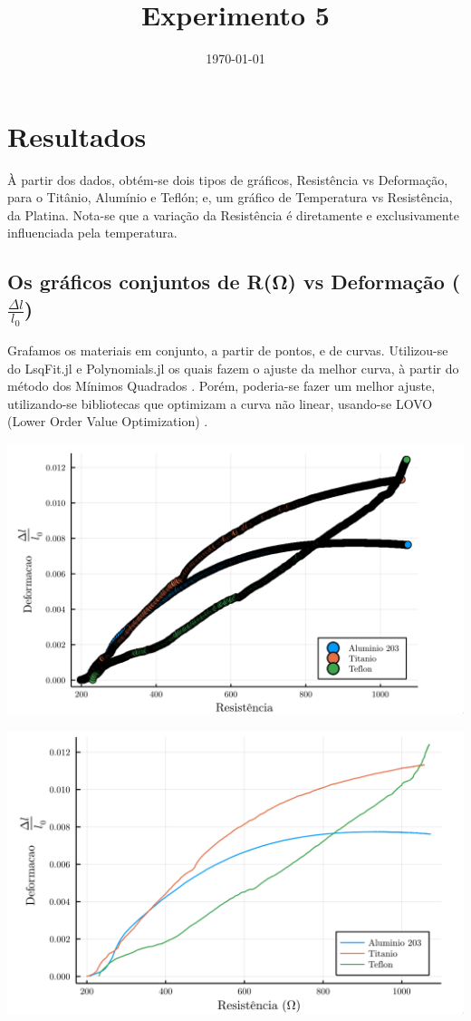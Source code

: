 \documentclass[11pt]{article}
\date{\today}
\title{Experimento 5}
\begin{document}
\maketitle
\tableofcontents




\section{Resultados}
\label{sec:orgb75f9fe}
À partir dos dados, obtém-se dois tipos de gráficos, Resistência vs Deformação,  para o Titânio, Alumínio e Teflón; e, um gráfico de Temperatura vs Resistência, da Platina. Nota-se que a variação da Resistência é diretamente e exclusivamente influenciada pela temperatura.

\subsection{Os gráficos conjuntos de R(Ω) vs Deformação (\(\frac{\Delta l}{l_0}\))}
\label{sec:org9e18702}

Grafamos os materiais em conjunto, a partir de pontos, e de curvas. Utilizou-se do LsqFit.jl e Polynomials.jl os quais fazem o ajuste da melhor curva, à partir do método dos Mínimos Quadrados \cite{boyd2018introduction}. Porém, poderia-se fazer um melhor ajuste\cite{castelani2019raff}, utilizando-se bibliotecas  que optimizam a curva não linear, usando-se LOVO (Lower Order Value Optimization) \cite{castelani2021robust}.

\href{img/comparacao-conjunta.png}{\includegraphics[width=.9\linewidth]{./img/comparacao-conjunta.png}}

\href{img/comparacao-conjunta-curva.png}{\includegraphics[width=.9\linewidth]{./img/comparacao-conjunta-curva.png}}
\end{document}
